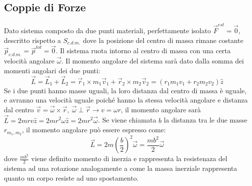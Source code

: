 \documentclass{article}
\numberwithin{equation}{subsection}
\begin{document}
\subsection{Coppie di Forze}
Dato sistema composto da due punti materiali, perfettamente 
isolato $\vec{F}^{est}=\vec{0}$, descritto rispetto a $S_{c.d.m.}$ 
dove la posizione del centro 
di massa rimane costante $\vec{p}_{c.d.m.}=\vec{p}^{tot}=\vec{0}$. 
Il sistema ruota intorno al centro di massa con una certa 
velocità angolare $\vec{\omega}$. Il momento angolare del sistema 
sarà dato dalla somma dei momenti angolari dei due punti: 
\begin{equation}
    \vec{L}=\vec{L}_1+\vec{L}_2=\vec{r}_1\times m_1\vec{v}_1+\vec{r}_2\times m_2\vec{v}_2=(r_1m_1v_1+r_2m_2v_2)\hat{z}
\end{equation}
Se i due punti hanno masse uguali, la loro distanza dal centro di 
massa è uguale, e avranno una velocità uguale poiché hanno la stessa 
velocità angolare e distanza dal centro $\vec{v}=\vec{\omega}\times\vec{r},\:\vec{\omega}\perp\vec{r}\rightarrow v=\omega r$, 
il momento angolare sarà $\vec{L}=2mrv\hat{z}=2mr^2\omega\hat{z}=2mr^2\vec{\omega}$. 
Se viene chiamata $b$ la distanza tra le due masse $r_{m_1,m_2}$, 
il momento angolare può essere espresso come:
\begin{equation}
    \vec{L}=\displaystyle 2m\left(\frac{b}{2}\right)^2\vec{\omega}=\frac{mb^2}{2}\vec{\omega}
\end{equation}
dove $\displaystyle\frac{mb^2}{2}$ viene definito momento di inerzia 
e rappresenta la resistenaza del sistema ad una rotazione analogamente a come  
la massa inerziale rappresenta quanto un corpo resiste ad uno spostamento. 

\begin{center}\end{center}
\end{document}
